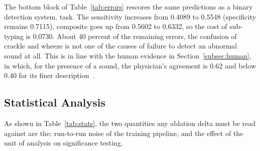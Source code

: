 \documentclass[journal,onecolumn]{IEEEtran}
\begin{document}
The bottom block of Table~\ref{tab:errors} rescores the same predictions as a binary detection system.
task. The sensitivity increases from 0.4089 to 0.5548 (specificity remains 0.7115), composite goes up from 0.5602 to 0.6332, so the cost of sub-typing is 0.0730. About 40 percent of the remaining errors, the confusion of crackle and wheeze is not one of the causes of failure to detect an abnormal sound at all. This is in line with the human evidence in Section~\ref{subsec:human}, in which, for the presence of a sound, the physician's agreement is 0.62 and below 0.40 for its finer description~\cite{melbye2016kappa,huang2024crackles}.


\subsection{Statistical Analysis}
\label{subsec:stats}

As shown in Table~\ref{tab:stats}, the two quantities any ablation delta must be read against are the:
run-to-run noise of the training pipeline, and the effect of the unit of analysis on
significance testing.
\end{document}
